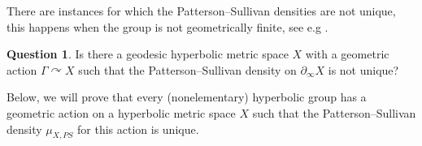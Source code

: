 \documentclass[12pt]{amsbook}%
\theoremstyle{definition}
\newtheorem{definition}[thm]{Definition}
\newtheorem{question}[thm]{Question}
\theoremstyle{remark}
\numberwithin{section}{chapter}
\numberwithin{subsection}{section}
\numberwithin{figure}{chapter}
\DeclareMathOperator{\acts}{\curvearrowright}
\def\Ga{\Gamma}
\def\geo{\partial_\infty}
\def\kap{}
\begin{document}
{{\begin{enumerate}
\end{enumerate} 

There are instances for which the Patterson--Sullivan densities are not unique, this happens when the group is not geometrically finite, see e.g \cite[p. 480]{mc_mullen_conformal_I}. 



\begin{question}
Is there a geodesic hyperbolic metric space $X$ with a geometric action $\Ga\acts X$ such that the Patterson--Sullivan density on $\geo X$ is not unique? 
\end{question}

Below, we will prove that every (nonelementary) hyperbolic group has a geometric action on a hyperbolic metric space $X$ %
such that the Patterson--Sullivan density $\mu_{X,PS}$ for this action is unique. %






}}
\end{document}

